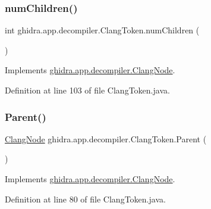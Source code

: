 \subsubsection{\texorpdfstring{numChildren()}{numChildren()}}
{\footnotesize\ttfamily int ghidra.\+app.\+decompiler.\+Clang\+Token.\+num\+Children (\begin{DoxyParamCaption}{ }\end{DoxyParamCaption})\hspace{0.3cm}{\ttfamily [inline]}}



Implements \mbox{\hyperlink{interfaceghidra_1_1app_1_1decompiler_1_1_clang_node_a28f5c1cfc3842ee74333e5d5a5910976}{ghidra.\+app.\+decompiler.\+Clang\+Node}}.



Definition at line 103 of file Clang\+Token.\+java.

\mbox{\label{classghidra_1_1app_1_1decompiler_1_1_clang_token_ae1b89249984d1228998b6fe8ed8c67b9}} 
\subsubsection{\texorpdfstring{Parent()}{Parent()}}
{\footnotesize\ttfamily \mbox{\hyperlink{interfaceghidra_1_1app_1_1decompiler_1_1_clang_node}{Clang\+Node}} ghidra.\+app.\+decompiler.\+Clang\+Token.\+Parent (\begin{DoxyParamCaption}{ }\end{DoxyParamCaption})\hspace{0.3cm}{\ttfamily [inline]}}



Implements \mbox{\hyperlink{interfaceghidra_1_1app_1_1decompiler_1_1_clang_node_a27b0287e5069850a61b4312f7d2737a4}{ghidra.\+app.\+decompiler.\+Clang\+Node}}.



Definition at line 80 of file Clang\+Token.\+java.

